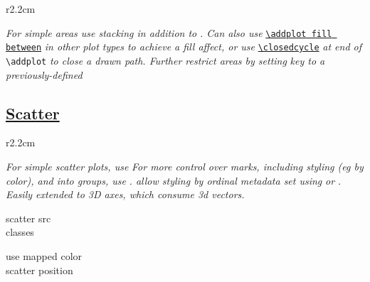 \begin{wrapfigure}[5]{r}{2.2cm}
\vspace{-8mm}
\resizebox{2cm}{!}{}
\end{wrapfigure}


\textit{For simple areas use stacking in addition to }\href{\docurl\#.pgfp/pgfplots/area:style}{}\textit{. Can also use }\texttt{\href{\docurl\#pgfp.fill:between}{\textbackslash addplot fill between}}\textit{ in other plot types to achieve a fill affect, or use }\texttt{\href{\docurl\#pgfp.back/closedcycle}{\textbackslash closedcycle}}\textit{ at end of }\texttt{\textbackslash addplot}\textit{ to close a drawn path. Further restrict areas  by setting }\href{\docurl\#pgfp.soft:clip}{}\textit{ key to a previously-defined }





\subsection*{\href{\docurl\#pgfp./pgfplots/scatter}{Scatter}}


\begin{wrapfigure}[5]{r}{2.2cm}
\vspace{-8mm}
\resizebox{2cm}{!}{}
\end{wrapfigure}

\textit{For simple scatter plots, use }\href{\docurl\#pgfp./tikz/only:marks}{}\textit{ For more control over marks, including styling (eg by color), and  into groups, use }\href{\docurl\#pgfp./pfgplots/scatter}{}\textit{.  allow styling by ordinal metadata set using }\href{\docurl\#pgfp./pgfplots/scatter:src}{}\textit{ or }\href{\docurl\#pgfp./pgfp/pgfplots/point:meta}{}\textit{. Easily extended to 3D axes, which consume 3d vectors.}

{\color{blue}
\begin{minipage}[t]{2.5cm}
scatter src\\
classes
\end{minipage}
\begin{minipage}[t]{3.5cm}
use mapped color\\
scatter position
\end{minipage}}




